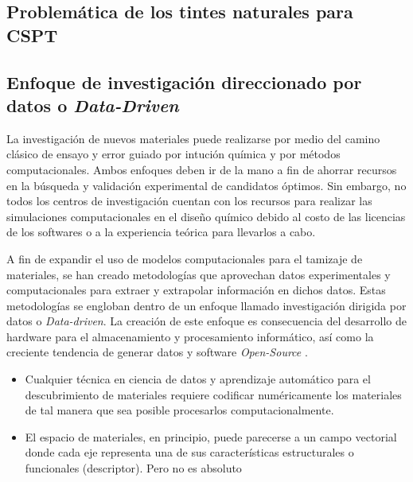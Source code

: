   \subsection{Problemática de los tintes naturales para CSPT}



\subsection{Enfoque de investigación direccionado por datos o \textit{Data-Driven}}

La investigación de nuevos materiales puede realizarse por medio del camino clásico de ensayo y error guiado por intución química y por métodos computacionales. Ambos enfoques deben ir de la mano a fin de ahorrar recursos en la búsqueda y validación experimental de candidatos óptimos. Sin embargo, no todos los centros de investigación cuentan con los recursos para realizar las simulaciones computacionales en el diseño químico debido al costo de las licencias de los softwares o a la experiencia teórica para llevarlos a cabo.

A fin de expandir el uso de modelos computacionales para el tamizaje de materiales, se han creado metodologías que aprovechan datos experimentales y computacionales para extraer y extrapolar información en dichos datos. Estas metodologías se engloban dentro de un enfoque llamado investigación dirigida por datos o \textit{Data-driven}. La creación de este enfoque es consecuencia del desarrollo de hardware para el almacenamiento y procesamiento informático, así como la creciente tendencia de generar datos y software  \textit{Open-Source} \cite{himanen2019data}. 


\begin{itemize}
    \item Cualquier técnica en ciencia de datos y aprendizaje automático para el descubrimiento de materiales requiere codificar numéricamente los materiales de tal manera que sea posible procesarlos computacionalmente.
    \item El espacio de materiales, en principio, puede parecerse a un campo vectorial donde cada eje representa una de sus características estructurales o funcionales (descriptor). Pero no es absoluto
\end{itemize}


